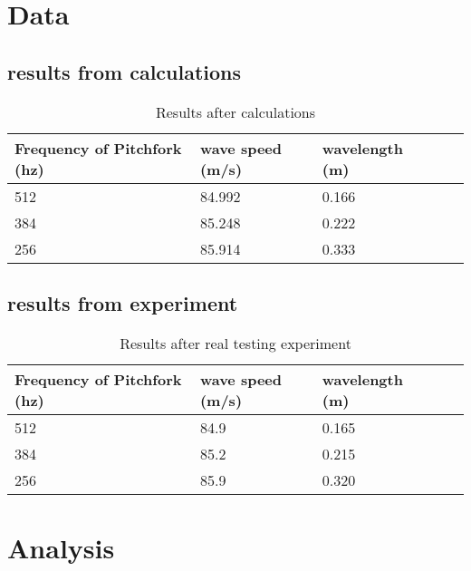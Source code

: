 \documentclass{article}
\begin{document}
\section{Data}
\subsection{results from calculations}
\begin{table}[htbp]
\begin{center}
\footnotesize
\begin{tabular}{lllll}
\toprule
 Frequency of Pitchfork (hz)        & wave speed (m/s)         & wavelength   (m)  \\
\midrule
  512   & 84.992        & 0.166 \\
    384   & 85.248         & 0.222   \\
   256  & 85.914        & 0.333    \\
\bottomrule
\end{tabular}
\end{center}
  \caption{Results after calculations}
  \label{tab:font-sizes}
\end{table}

\subsection{results from experiment}
\begin{table}[htbp]
\begin{center}
\footnotesize
\begin{tabular}{lllll}
\toprule
 Frequency of Pitchfork (hz)        & wave speed (m/s)         & wavelength   (m)  \\
\midrule
  512   & 84.9        & 0.165 \\
  384   & 85.2        & 0.215 \\
  256   & 85.9        & 0.320 \\
\bottomrule
\end{tabular}
\end{center}
  \caption{Results after real testing experiment}
  \label{tab:font-sizes}
\end{table}
\newpage
\section{Analysis}
\end{document}
